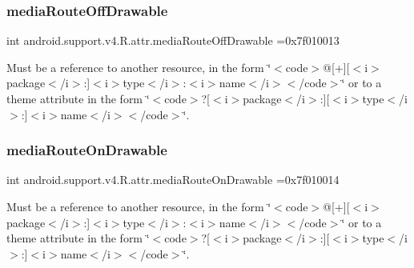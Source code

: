 \subsubsection{\texorpdfstring{media\+Route\+Off\+Drawable}{mediaRouteOffDrawable}}
{\footnotesize\ttfamily int android.\+support.\+v4.\+R.\+attr.\+media\+Route\+Off\+Drawable =0x7f010013\hspace{0.3cm}{\ttfamily [static]}}

Must be a reference to another resource, in the form \char`\"{}$<$code$>$@\mbox{[}+\mbox{]}\mbox{[}$<$i$>$package$<$/i$>$\+:\mbox{]}$<$i$>$type$<$/i$>$\+:$<$i$>$name$<$/i$>$$<$/code$>$\char`\"{} or to a theme attribute in the form \char`\"{}$<$code$>$?\mbox{[}$<$i$>$package$<$/i$>$\+:\mbox{]}\mbox{[}$<$i$>$type$<$/i$>$\+:\mbox{]}$<$i$>$name$<$/i$>$$<$/code$>$\char`\"{}. \mbox{\label{classandroid_1_1support_1_1v4_1_1R_1_1attr_ab0b06761d2a873fde85c520765dc2885}} 
\subsubsection{\texorpdfstring{media\+Route\+On\+Drawable}{mediaRouteOnDrawable}}
{\footnotesize\ttfamily int android.\+support.\+v4.\+R.\+attr.\+media\+Route\+On\+Drawable =0x7f010014\hspace{0.3cm}{\ttfamily [static]}}

Must be a reference to another resource, in the form \char`\"{}$<$code$>$@\mbox{[}+\mbox{]}\mbox{[}$<$i$>$package$<$/i$>$\+:\mbox{]}$<$i$>$type$<$/i$>$\+:$<$i$>$name$<$/i$>$$<$/code$>$\char`\"{} or to a theme attribute in the form \char`\"{}$<$code$>$?\mbox{[}$<$i$>$package$<$/i$>$\+:\mbox{]}\mbox{[}$<$i$>$type$<$/i$>$\+:\mbox{]}$<$i$>$name$<$/i$>$$<$/code$>$\char`\"{}. \mbox{\label{classandroid_1_1support_1_1v4_1_1R_1_1attr_a80277237767ae78c2a6f73dbf259f031}} 
